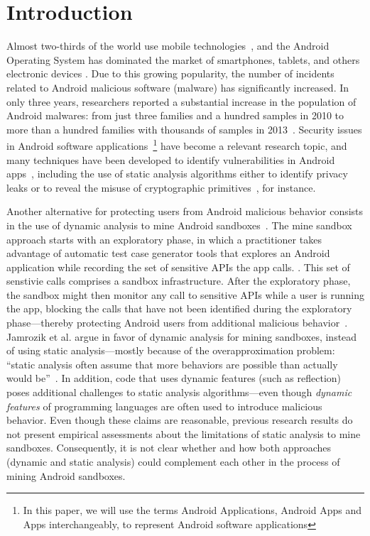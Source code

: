 \section{Introduction}\label{sec:introduction}

Almost two-thirds of the world use mobile technologies~\cite{Comscore}, and the Android Operating System has dominated the market of smartphones, tablets, and others electronic devices \cite{statcounter}. Due to this growing popularity, the number of incidents related to Android malicious software (malware) has significantly increased. In only three years, researchers reported a substantial increase in the population of Android malwares: from just three families and a hundred samples in 2010 to more than a hundred families with thousands of samples in 2013~\cite{DBLP:journals/comsur/FarukiBLGGCR15,DBLP:journals/csur/SufatrioTCT15}. Security issues in Android software applications~\footnote{In this paper, we will use the terms Android Applications, Android Apps and Apps interchangeably, to represent Android software applications} have become a relevant research topic, and many techniques have been developed to identify vulnerabilities in Android apps~\cite{DBLP:conf/pldi/ArztRFBBKTOM14}, including the use of static analysis algorithms either to identify privacy leaks or to reveal the misuse of cryptographic primitives~\cite{krueger:ecoop-2018,rahaman:ccs-2019}, for instance.

Another alternative for protecting users from Android malicious behavior consists in the use of dynamic analysis to mine Android sandboxes~\cite{DBLP:conf/icse/JamrozikSZ16}. The mine sandbox approach starts with an
exploratory phase, in which a practitioner takes advantage of automatic test case generator tools that explores an Android application while recording the set of sensitive APIs the app calls. 
. This set of senstivie calls comprises a sandbox infrastructure. After the exploratory phase, the sandbox might then monitor any call to sensitive APIs while a user is running the app, blocking the calls that have not been identified during the exploratory phase---thereby protecting Android users from additional malicious behavior~\cite{DBLP:conf/icse/JamrozikSZ16}.
Jamrozik et al. argue in favor of dynamic analysis for mining sandboxes, instead of using static analysis---mostly because of the overapproximation problem: ``static analysis often assume that more behaviors are possible than actually would be''~\cite{DBLP:conf/icse/JamrozikSZ16}. In addition, code that uses dynamic features (such as reflection) poses additional challenges to static analysis algorithms---even though \emph{dynamic features} of programming languages are often used to introduce malicious behavior. Even though these claims are reasonable, previous research results do not present empirical assessments about the limitations of static analysis to mine sandboxes. Consequently, it is not clear whether and how both approaches (dynamic and static analysis) could complement each other in the process of mining Android sandboxes.

